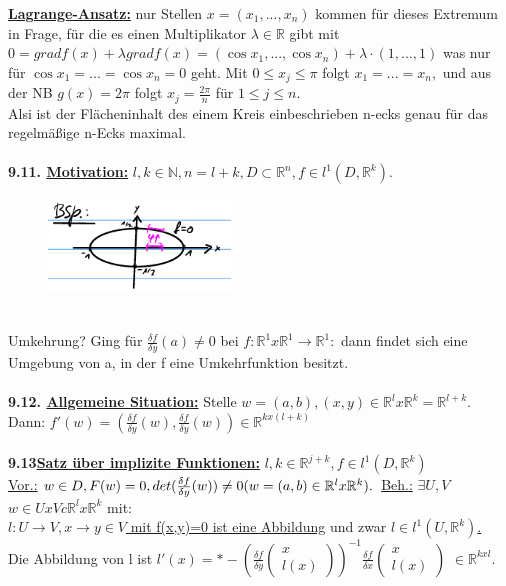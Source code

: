 \documentclass[]{scrartcl}
\begin{document}
	\textbf{\underline{Lagrange-Ansatz:}} nur Stellen $x=(x_1,...,x_n)$ kommen für dieses Extremum in Frage, für die es einen Multiplikator $\lambda\in \mathbb{R}$ gibt mit $0=grad f(x)+\lambda grad f(x)=(\cos x_1,...,\cos x_n)+\lambda\cdot(1,...,1)$ was nur für $\cos x_1 =...=\cos x_n=0$ geht. Mit $0\leq x_j \leq \pi$ folgt $x_1=...=x_n,$ und aus der NB $g(x)=2\pi$ folgt $x_j=\frac{2\pi}{n}$ für $1\leq j\leq n$.\\
	Alsi ist der Flächeninhalt des einem Kreis einbeschrieben n-ecks genau für das regelmäßige n-Ecks maximal.\\
	\\
	\textbf{9.11. \underline{Motivation:}} $l,k\in \mathbb{N}, n=l+k, D\subset \mathbb{R}^n, f\in l^1(D,\mathbb{R}^k).$\\
	\begin{figure}[h]
		\includegraphics[width=5 cm,height=2.5cm]{bsp kap 9.11}
	\end{figure}\\
	Umkehrung? Ging für $\frac{\delta f}{\delta y}(a)\neq0$ bei $f:\mathbb{R}^1 x \mathbb{R}^1\rightarrow\mathbb{R}^1:$ dann findet sich eine Umgebung von a, in der f eine Umkehrfunktion besitzt.\\
	\\
	\textbf{9.12. \underline{Allgemeine Situation:}} Stelle $w=(a,b), (x,y)\in\mathbb{R}^l x \mathbb{R}^k=\mathbb{R}^{l+k}.$\\
	Dann: $f'(w)=(\frac{\delta f}{\delta y}(w), \frac{\delta f}{\delta y}(w))\in \mathbb{R}^{k x(l+k)} $\\
	\\
	\textbf{9.13\ul{Satz über implizite Funktionen:}} $l,k \in \mathbb{R}^{j+k}, f\in l^1(D,\mathbb{R}^k)$\\
	\underline{Vor.:} $w\in D,F(w)=0, det(\frac{\delta f}{\delta y}(w))\neq 0 (w=(a,b)\in\mathbb{R}^lx\mathbb{R}^k).\\$
	\underline{Beh.:} $\exists U,V$  \ul{$w\in U x V c \mathbb{R}^lx\mathbb{R}^k$} mit: \\
	\ul{$l:U\rightarrow V, x\rightarrow y \in V$ mit f(x,y)=0 ist eine Abbildung} und zwar 
	\ul{$l \in l^1 (U,\mathbb{R}^k)$.}\\
	Die Abbildung von l ist \ul{$l'(x)=*-(\frac{\delta f}{\delta y}\begin{pmatrix}x\\l(x)
		\end{pmatrix})^{-1}\frac{\delta f}{\delta x}\begin{pmatrix}
		x\\l(x)
	\end{pmatrix}$} $\in \mathbb{R}^{kxl}$.\\
\end{document}
